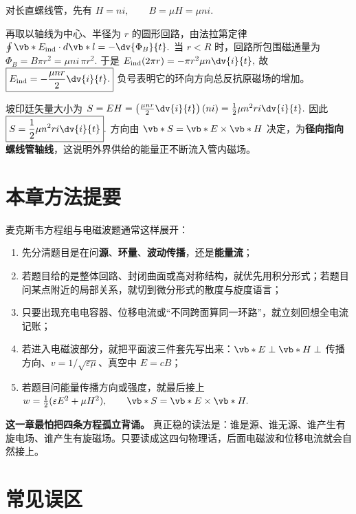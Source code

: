 \documentclass[lang=cn,11pt]{elegantbook}
\begin{document}
\begin{solution}
对长直螺线管，先有
 \(H=ni, \qquad B=\mu H=\mu ni.\) 

再取以轴线为中心、半径为 \(r\) 的圆形回路，由法拉第定律
 \(\oint \vb*{E}_{\mathrm{ind}}\cdot d\vb*{l} =-\dv{\Phi_B}{t}.\) 
当 \(r<R\) 时，回路所包围磁通量为
 \(\Phi_B=B\pi r^2=\mu ni\,\pi r^2.\) 
于是
 \(E_{\mathrm{ind}}(2\pi r) =-\pi r^2\mu n\dv{i}{t},\) 
故
 \(\boxed{ E_{\mathrm{ind}}=-\frac{\mu nr}{2}\dv{i}{t}. }\) 
负号表明它的环向方向总反抗原磁场的增加。

坡印廷矢量大小为
 \(S=EH =\left(\frac{\mu nr}{2}\dv{i}{t}\right)(ni) =\frac12\mu n^2ri\dv{i}{t}.\) 
因此
 \(\boxed{ S=\frac12\mu n^2ri\dv{i}{t} }.\) 
方向由 \(\vb*{S}=\vb*{E}\times \vb*{H}\) 决定，为\textbf{径向指向螺线管轴线}，这说明外界供给的能量正不断流入管内磁场。
\end{solution}

\section{本章方法提要}

麦克斯韦方程组与电磁波题通常这样展开：
\begin{enumerate}
 \item 先分清题目是在问\textbf{源}、\textbf{环量}、\textbf{波动传播}，还是\textbf{能量流}；
 \item 若题目给的是整体回路、封闭曲面或高对称结构，就优先用积分形式；若题目问某点附近的局部关系，就切到微分形式的散度与旋度语言；
 \item 只要出现充电电容器、位移电流或“不同跨面算同一环路”，就立刻回想全电流记账；
 \item 若进入电磁波部分，就把平面波三件套先写出来：\(\vb*{E}\perp \vb*{H}\perp\) 传播方向、\(v=1/\sqrt{\varepsilon\mu}\)、真空中 \(E=cB\)；
 \item 若题目问能量传播方向或强度，就最后接上
 \(w=\frac12(\varepsilon E^2+\mu H^2), \qquad \vb*{S}=\vb*{E}\times\vb*{H}.\) 
\end{enumerate}

\begin{note}
\textbf{这一章最怕把四条方程孤立背诵。} 真正稳的读法是：谁是源、谁无源、谁产生有旋电场、谁产生有旋磁场。只要读成这四句物理话，后面电磁波和位移电流就会自然接上。
\end{note}

\section{常见误区}
\end{document}
